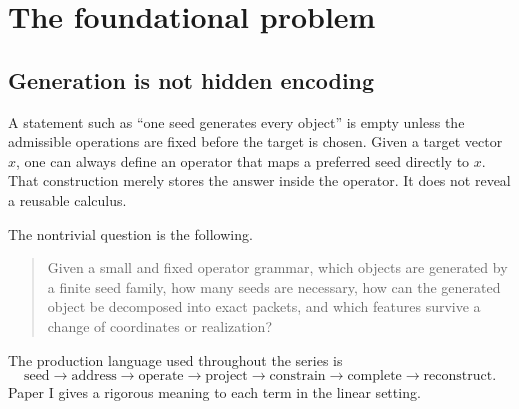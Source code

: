 \documentclass[11pt]{article}
\theoremstyle{definition}
\theoremstyle{remark}
\begin{document}
\begin{center}
\end{center}

\tableofcontents
\listoffigures
\listoftables
\clearpage

\section{The foundational problem}

\subsection{Generation is not hidden encoding}

A statement such as ``one seed generates every object'' is empty unless the admissible operations are fixed before the target is chosen. Given a target vector $x$, one can always define an operator that maps a preferred seed directly to $x$. That construction merely stores the answer inside the operator. It does not reveal a reusable calculus.

The nontrivial question is the following.

\begin{quote}
Given a small and fixed operator grammar, which objects are generated by a finite seed family, how many seeds are necessary, how can the generated object be decomposed into exact packets, and which features survive a change of coordinates or realization?
\end{quote}

The production language used throughout the series is
\[
\boxed{
\text{seed}
\longrightarrow
\text{address}
\longrightarrow
\text{operate}
\longrightarrow
\text{project}
\longrightarrow
\text{constrain}
\longrightarrow
\text{complete}
\longrightarrow
\text{reconstruct}.
}
\]
Paper I gives a rigorous meaning to each term in the linear setting.
\end{document}
